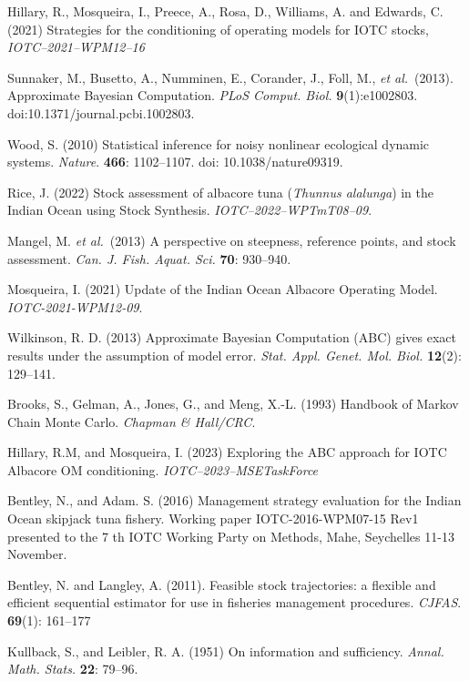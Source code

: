 \documentclass[11pt]{article}
\newcommand{\etal}{\textit{et al.}}
\begin{document}
\clearpage
\begin{thebibliography}{99}
       
     Hillary, R., Mosqueira, I., Preece, A., Rosa, D., Williams, A. and Edwards, C. (2021) Strategies for the conditioning of operating models for IOTC stocks, \textit{IOTC--2021--WPM12--16}
    
     Sunnaker, M., Busetto, A., Numminen, E., Corander, J., Foll, M., \etal~(2013). Approximate Bayesian Computation. \textit{PLoS Comput. Biol.} {\bf 9}(1):e1002803. doi:10.1371/journal.pcbi.1002803.
         
     Wood, S. (2010) Statistical inference for noisy nonlinear ecological dynamic systems. \textit{Nature}. {\bf 466}: 1102--1107. doi: 10.1038/nature09319.

     Rice, J. (2022) Stock assessment of albacore tuna (\textit{Thunnus alalunga}) in the Indian Ocean using Stock Synthesis. \textit{IOTC--2022--WPTmT08--09}.

     Mangel, M. \etal~(2013) A perspective on steepness, reference points, and stock assessment. \textit{Can. J. Fish. Aquat. Sci.} {\bf 70}: 930--940.

     Mosqueira, I. (2021) Update of the Indian Ocean Albacore Operating Model. \textit{IOTC-2021-WPM12-09}.

     Wilkinson, R. D. (2013) Approximate Bayesian Computation (ABC) gives exact results under the assumption of model error. \textit{Stat. Appl. Genet. Mol. Biol.} {\bf 12}(2): 129--141.
    
     Brooks, S., Gelman, A., Jones, G., and Meng, X.-L. (1993) Handbook of Markov Chain Monte Carlo. \textit{Chapman \& Hall/CRC}.

     Hillary, R.M, and Mosqueira, I. (2023) Exploring the ABC approach for IOTC Albacore
        OM conditioning. \textit{IOTC--2023--MSETaskForce}
    
     Bentley, N., and Adam. S. (2016) Management strategy evaluation for the Indian Ocean skipjack tuna fishery. Working paper IOTC-2016-WPM07-15 Rev1 presented to the 7 th IOTC Working Party on Methods, Mahe, Seychelles 11-13 November.
    
     Bentley, N. and Langley, A. (2011). Feasible stock trajectories: a flexible and efficient sequential estimator for use in fisheries management procedures. \textit{CJFAS}. {\bf 69}(1): 161--177  

     Kullback, S., and Leibler, R. A. (1951) On information and sufficiency. \textit{Annal. Math. Stats.} {\bf 22}: 79--96.

\end{thebibliography}
\end{document}

